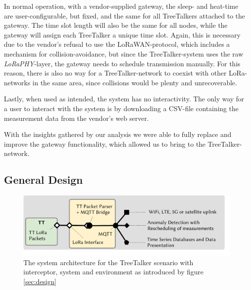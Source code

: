 In normal operation, with a vendor-supplied gateway, the sleep- and heat-time are user-configurable, but fixed, and the same for all TreeTalkers attached to the gateway.
The time slot length will also be the same for all nodes, while the gateway will assign each TreeTalker a unique time slot.
Again, this is necessary due to the vendor's refusal to use the LoRaWAN-protocol, which includes a mechanism for collision-avoidance, but since the TreeTalker-system uses the raw \textit{LoRaPHY}-layer, the gateway needs to schedule transmission manually.
For this reason, there is also no way for a TreeTalker-network to coexist with other LoRa-networks in the same area, since collisions would be plenty and unrecoverable.

Lastly, when used as intended, the system has no interactivity.
The only way for a user to interact with the system is by downloading a CSV-file containing the measurement data from the vendor's web server.

With the insights gathered by our analysis we were able to fully replace and improve the gateway functionality, which allowed us to bring \mm to the TreeTalker-network.

\subsection{General Design}
\label{sec:TreeTalker:design}

\begin{figure}
    \centering
    \includegraphics[width=\linewidth]{figures/MechanismInterceptionTTT.pdf}
    \caption{The system architecture for the TreeTalker scenario with interceptor, system and environment as introduced by figure \ref{sec:design}}
    \label{fig:evaluation:ttt_response}
\end{figure}

